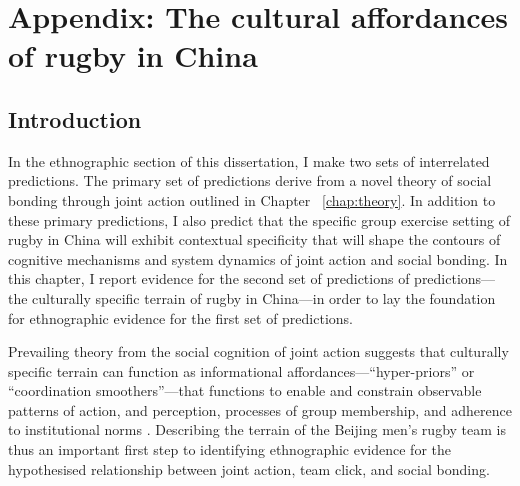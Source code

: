 \chapter{\label{app5:ethnoField}Appendix: The cultural affordances of rugby in China}



















\section{Introduction}

In the ethnographic section of this dissertation, I make two sets of interrelated predictions.  The primary set of predictions derive from a novel theory of social bonding through joint action outlined in Chapter ~\ref{chap:theory}.  In addition to these primary predictions, I also predict that the specific group exercise setting of rugby in China will exhibit contextual specificity that will shape the contours of cognitive mechanisms and system dynamics of joint action and social bonding.  In this chapter, I report evidence for the second set of predictions of predictions---the culturally specific terrain of rugby in China---in order to lay the foundation for ethnographic evidence for the first set of predictions.

Prevailing theory from the social cognition of joint action suggests that culturally specific terrain can function as informational affordances---``hyper-priors'' or ``coordination smoothers''---that functions to enable and constrain observable patterns of action, and perception, processes of group membership, and adherence to institutional norms \citep{Clark2015}.  Describing the terrain of the Beijing men's rugby team is thus an important first step to identifying ethnographic evidence for the hypothesised relationship between joint action, team click, and social bonding.

